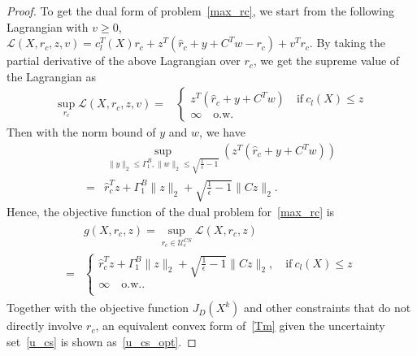 \documentclass[10pt,twocolumn,twoside,english]{IEEEtran}
\begin{document}
\begin{proof}
To get the dual form of problem~\eqref{max_rc}, we start from the following Lagrangian with $v\geqslant 0$,
$\mathcal{L}(X,r_c, z, v)
=c_l^T(X) r_c + z^T (\hat{r}_c +y+C^Tw-r_c)+v^T r_c.$
By taking the partial derivative of the above Lagrangian over $r_c$, we get the supreme value of the Lagrangian as
\begin{align*}
\sup_{r_c} \mathcal{L}(X,r_c, z, v)=&\begin{cases} z^T (\hat{r}_c +y+C^Tw)\quad \text{if}\ c_l(X) \leqslant z\\  
           \infty \quad \text{o.w.}
\end{cases}
\end{align*}
Then with the norm bound of $y$ and $w$, we have
\begin{align*}
&\sup_{\|y\|_2 \leqslant \Gamma_1^B, \|w\|_2 \leqslant \sqrt{\frac{1}{\epsilon}-1}}(z^T (\hat{r}_c +y+C^Tw))\\
=&\hat{r}^T_c z+\Gamma_1^B \|z\|_2 +\sqrt{\frac{1}{\epsilon}-1} \|Cz\|_2.
\end{align*} 
Hence, the objective function of the dual problem for~\eqref{max_rc} is
\begin{align*}
\begin{split}
&g(X, r_c, z)=\sup_{r_c \in \mathcal{U}_{\epsilon}^{CS}} \mathcal{L}(X,r_c, z)\\
=&\begin{cases} 
 \hat{r}^T_c z+\Gamma_1^B \|z\|_2 +\sqrt{\frac{1}{\epsilon}-1} \|Cz\|_2,\quad
  \text{if}\ c_l(X) \leqslant z \\
           \infty \quad \text{o.w.}.\\                                
\end{cases}
\end{split}
\end{align*}
Together with the objective function $J_D(X^k)$ and other constraints that do not directly involve $r_c$, an equivalent convex form of~\eqref{Tm} given the uncertainty set~\eqref{u_cs} is shown as~\eqref{u_cs_opt}.
\end{proof} 
\end{document}
